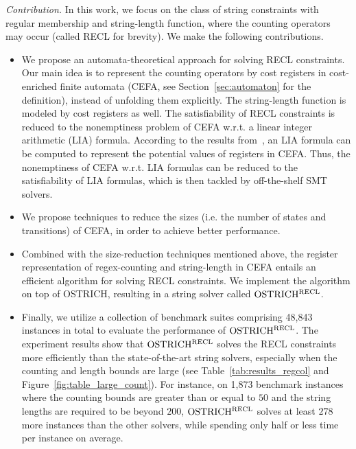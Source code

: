 \medskip
\noindent 
\emph{Contribution.} In this work, we focus on the class of string constraints with regular membership and string-length function, where the counting operators may occur (called RECL for brevity). We make the following contributions.
\begin{itemize}
  \item We propose an automata-theoretical approach for solving RECL constraints. 
  Our main idea is to represent the counting operators by cost registers in cost-enriched finite automata (CEFA, see Section~\ref{sec:automaton} for the definition), instead of unfolding them explicitly. The string-length function is modeled by cost registers as well. The satisfiability of RECL constraints is reduced to the nonemptiness problem of CEFA w.r.t. a linear integer arithmetic (LIA) formula. According to the results from~\cite{atva2020}, an LIA formula can be computed to represent the potential values of registers in CEFA.
Thus, the nonemptiness of CEFA w.r.t. LIA formulas can be reduced to the satisfiability of LIA formulas, which is then tackled by off-the-shelf SMT solvers.
  \item We propose techniques to reduce the sizes (i.e. the number of states and transitions) of CEFA, in order to achieve better performance.
  \item Combined with the size-reduction techniques mentioned above, the register representation of regex-counting and string-length in CEFA entails an efficient algorithm for solving RECL constraints. We implement the algorithm on top of OSTRICH, resulting in a string solver called $\rm OSTRICH^{RECL}$. 
  \item Finally, we utilize a collection of benchmark suites comprising 48,843 instances in total to evaluate the performance of $\rm OSTRICH^{RECL}$. The experiment results show that $\rm OSTRICH^{RECL}$ solves the RECL constraints more efficiently than the state-of-the-art string solvers, especially when the counting and length bounds are large (see Table~\ref{tab:results_regcol} and Figure~\ref{fig:table_large_count}). For instance, on 1,873 benchmark instances where the counting bounds are greater than or equal to $50$ and the string lengths are required to be beyond $200$, $\rm OSTRICH^{RECL}$ solves at least $278$ more instances than the other solvers, while spending only half or less time per instance on average. 
\end{itemize}

